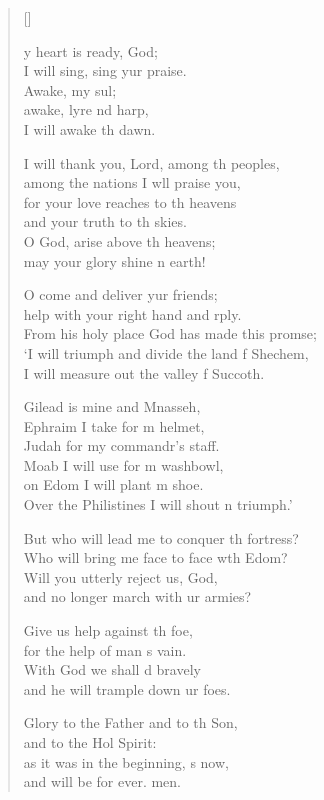 \settowidth{\versewidth}{From his holy place God has made this promise; +}
\begin{verse}[\versewidth]
  \begin{patverse}
y heart is ready,  God;\Med\\
I will sing, sing yur praise.\\
Awake, my sul;\Flex\\
awake, lyre nd harp,\Med\\
I will awake th dawn.

I will thank you, Lord, among th peoples,\Med\\
among the nations I w\pointup{\i}ll praise you,\\
for your love reaches to th heavens\Med\\
and your truth to th skies.\\
O God, arise above th heavens;\Med\\
may your glory shine n earth!

O come and deliver yur friends;\Med\\
help with your right hand and rply.\\
From his holy place God has made this prom\pointup{\i}se;\Flex\\
‘I will triumph and divide the land f Shechem,\\
I will measure out the valley f Succoth.

Gilead is mine and Mnasseh,\Med\\
Ephraim I take for m helmet,\\
Judah for my commandr’s staff.\Med\\
Moab I will use for m washbowl,\\
on Edom I will plant m shoe.\Med\\
Over the Philistines I will shout \pointup{\i}n triumph.’

But who will lead me to conquer th fortress?\Med\\
Who will bring me face to face w\pointup{\i}th Edom?\\
Will you utterly reject us,  God,\Med\\
and no longer march with ur armies?

Give us help against th foe,\Med\\
for the help of man \pointup{\i}s vain.\\
With God we shall d bravely\Med\\
and he will trample down ur foes.

Glory to the Father and to th Son,\Med\\
and to the Hol Spirit:\\
as it was in the beginning, \pointup{\i}s now,\Med\\
and will be for ever. men.
  \end{patverse}
  \end{verse}

